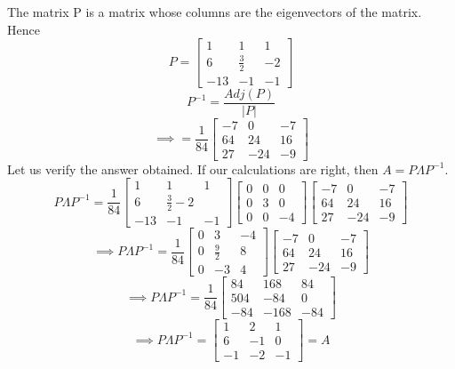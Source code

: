\documentclass[solution,addpoints,12pt]{exam}
\newenvironment{Solution}{\begin{solution}}{\end{solution}}
\begin{document}
\begin{questions}
\begin{Solution}
The matrix P is a matrix whose columns are the eigenvectors of the matrix. Hence
\[P = \begin{bmatrix}
    1 & 1 & 1 \\
    6 & \frac{3}{2} & -2 \\
    -13 & -1 & -1
\end{bmatrix}\]
\[P^{-1} = \frac{Adj(P)}{|P|}\]
\[\implies = \frac{1}{84}\begin{bmatrix}
    -7 & 0 & -7 \\
    64 & 24 & 16 \\
    27 & -24 & -9
\end{bmatrix}\]
Let us verify the answer obtained. If our calculations are right, then $A = P \Lambda P^{-1}$.
\[P \Lambda P^{-1} = \frac{1}{84}\begin{bmatrix}
    1 & 1 & 1 \\ 6 & \frac{3}{2} -2 \\ -13 & -1 & -1
\end{bmatrix}\begin{bmatrix}
    0 & 0 & 0 \\ 0 & 3 & 0 \\ 0 & 0 & -4
\end{bmatrix}\begin{bmatrix}
    -7 & 0 & -7 \\ 64 & 24 & 16 \\ 27 & -24 & -9
\end{bmatrix}\]
\[\implies P \Lambda P^{-1} = \frac{1}{84}\begin{bmatrix}
    0 & 3 & -4 \\0 & \frac{9}{2} & 8 \\ 0 & -3 & 4
\end{bmatrix}\begin{bmatrix}
    -7 & 0 & -7 \\ 64 & 24 & 16 \\ 27 & -24 & -9
\end{bmatrix}\]
\[\implies P \Lambda P^{-1} = \frac{1}{84}\begin{bmatrix}
    84 & 168 & 84 \\ 504 & -84 & 0 \\ -84 & -168 & -84
\end{bmatrix}\]
\[\implies P \Lambda P^{-1} = \begin{bmatrix}
    1 & 2 & 1 \\ 6 & -1 & 0 \\ -1 & -2 & -1
\end{bmatrix} = A\]
\end{Solution}


\end{questions}
\end{document}
